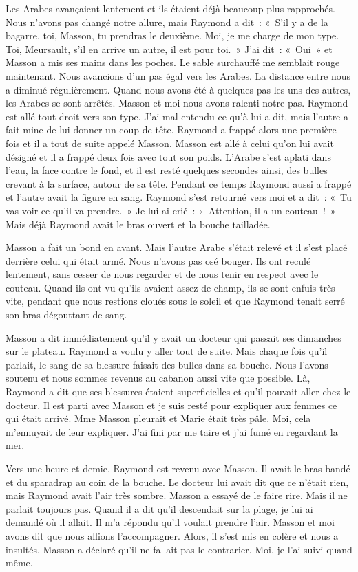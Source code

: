 \documentclass[french,twoside]{book} %
\begin{document}
Les Arabes avançaient lentement et ils étaient déjà beaucoup plus rapprochés. Nous n’avons pas changé notre allure, mais Raymond a dit : « S'il y a de la bagarre, toi, Masson, tu prendras le deuxième. Moi, je me charge de mon type. Toi, Meursault, s’il en arrive un autre, il est pour toi. » J'ai dit : « Oui » et Masson a mis ses mains dans les poches. Le sable surchauffé me semblait rouge maintenant. Nous avancions d’un pas égal vers les Arabes. La distance entre nous a diminué régulièrement. Quand nous avons été à quelques pas les uns des autres, les Arabes se sont arrêtés. Masson et moi nous avons ralenti notre pas. Raymond est allé tout droit vers son type. J'ai mal entendu ce qu’à lui a dit, mais l’autre a fait mine de lui donner un coup de tête. Raymond a frappé alors une première fois et il a tout de suite appelé Masson. Masson est allé à celui qu’on lui avait désigné et il a frappé deux fois avec tout son poids. L'Arabe s’est aplati dans l’eau, la face contre le fond, et il est resté quelques secondes ainsi, des bulles crevant à la surface, autour de sa tête. Pendant ce temps Raymond aussi a frappé et l’autre avait la figure en sang. Raymond s’est retourné vers moi et a dit : « Tu vas voir ce qu’il va prendre. » Je lui ai crié : « Attention, il a un couteau ! » Mais déjà Raymond avait le bras ouvert et la bouche tailladée.\par
Masson a fait un bond en avant. Mais l’autre Arabe s’était relevé et il s’est placé derrière celui qui était armé. Nous n’avons pas osé bouger. Ils ont reculé lentement, sans cesser de nous regarder et de nous tenir en respect avec le couteau. Quand ils ont vu qu’ils avaient assez de champ, ils se sont enfuis très vite, pendant que nous restions cloués sous le soleil et que Raymond tenait serré son bras dégouttant de sang.\par
Masson a dit immédiatement qu’il y avait un docteur qui passait ses dimanches sur le plateau. Raymond a voulu y aller tout de suite. Mais chaque fois qu’il parlait, le sang de sa blessure faisait des bulles dans sa bouche. Nous l’avons soutenu et nous sommes revenus au cabanon aussi vite que possible. Là, Raymond a dit que ses blessures étaient superficielles et qu’il pouvait aller chez le docteur. Il est parti avec Masson et je suis resté pour expliquer aux femmes ce qui était arrivé. Mme Masson pleurait et Marie était très pâle. Moi, cela m’ennuyait de leur expliquer. J'ai fini par me taire et j’ai fumé en regardant la mer.\par
Vers une heure et demie, Raymond est revenu avec Masson. Il avait le bras bandé et du sparadrap au coin de la bouche. Le docteur lui avait dit que ce n’était rien, mais Raymond avait l’air très sombre. Masson a essayé de le faire rire. Mais il ne parlait toujours pas. Quand il a dit qu’il descendait sur la plage, je lui ai demandé où il allait. Il m’a répondu qu’il voulait prendre l’air. Masson et moi avons dit que nous allions l’accompagner. Alors, il s’est mis en colère et nous a insultés. Masson a déclaré qu’il ne fallait pas le contrarier. Moi, je l’ai suivi quand même.\par
\end{document}
